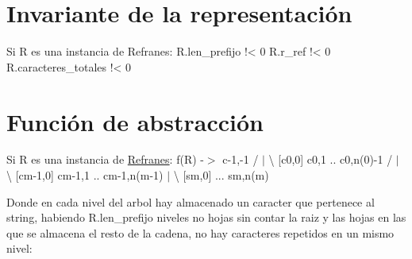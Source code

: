 \hypertarget{repRefranes_invRefranes}{}\section{Invariante de la representación}\label{repRefranes_invRefranes}
\begin{DoxyVerb}Si R es una instancia de Refranes:
  R.len_prefijo !< 0
  R.r_ref !< 0
  R.caracteres_totales !< 0
\end{DoxyVerb}
\hypertarget{repRefranes_faRefranes}{}\section{Función de abstracción}\label{repRefranes_faRefranes}
Si R es una instancia de \hyperlink{class_refranes}{Refranes}\+: f(\+R) -\/$>$ c-\/1,-\/1 / $\vert$ \textbackslash{} \mbox{[}c0,0\mbox{]} c0,1 .. c0,n(0)-\/1 / $\vert$ \textbackslash{} \mbox{[}cm-\/1,0\mbox{]} cm-\/1,1 .. cm-\/1,n(m-\/1) $\vert$ \textbackslash{} \mbox{[}sm,0\mbox{]} ... sm,n(m)

Donde en cada nivel del arbol hay almacenado un caracter que pertenece al string, habiendo R.\+len\+\_\+prefijo niveles no hojas sin contar la raiz y las hojas en las que se almacena el resto de la cadena, no hay caracteres repetidos en un mismo nivel\+:

